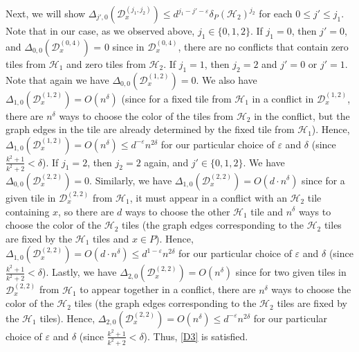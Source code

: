 \documentclass{article}
\theoremstyle{definition}
\newcommand\cH{{\mathcal H}}
\newcommand{\cD}{\mathcal{D}}
\begin{document}
    Next, we will show $\Delta_{j',0} \left(\cD_x^{(j_1,j_2)} \right) \leq d^{j_1 - j' - \varepsilon} \delta_P(\cH_2)^{j_2}$ for each $0 \leq j' \leq j_1$.  Note that in our case, as we observed above, $j_1 \in \{ 0, 1, 2 \}$.  If $j_1 = 0$, then $j' = 0$, and $\Delta_{0,0}\left(\cD_x^{(0,4)} \right)$ = 0 since in $\cD_x^{(0,4)}$, there are no conflicts that contain zero tiles from $\cH_1$ and zero tiles from $\cH_2$.  If $j_1 = 1$, then $j_2 = 2$ and $j' = 0$ or $j' = 1$.  Note that again we have $\Delta_{0,0} \left(\cD_x^{(1,2)} \right) = 0$.  We also have $\Delta_{1,0} \left(\cD_x^{(1,2)} \right) = O(n^\delta)$ (since for a fixed tile from $\cH_1$ in a conflict in $\cD_x^{(1,2)}$, there are $n^\delta$ ways to choose the color of the tiles from $\cH_2$ in the conflict, but the graph edges in the tile are already determined by the fixed tile from $\cH_1$).  Hence, $\Delta_{1,0}\left(\cD_x^{(1,2)}\right) = O(n^\delta) \leq d^{-\varepsilon} n^{2\delta}$ for our particular choice of $\varepsilon$ and $\delta$ (since $\frac{k^2+1}{k^2+2} < \delta$).  If $j_1 = 2$, then $j_2 = 2$ again, and $j' \in \{0,1,2\}$.  We have $\Delta_{0,0}\left(\cD_x^{(2,2)}\right) = 0$.  Similarly, we have $\Delta_{1,0} \left(\cD_x^{(2,2)} \right) = O(d \cdot n^\delta)$ since for a given tile in $\cD_x^{(2,2)}$ from $\cH_1$, it must appear in a conflict with an $\cH_2$ tile containing $x$, so there are $d$ ways to choose the other $\cH_1$ tile and $n^\delta$ ways to choose the color of the $\cH_2$ tiles (the graph edges corresponding to the $\cH_2$ tiles are fixed by the $\cH_1$ tiles and $x \in P$).  Hence, $\Delta_{1,0}\left(\cD_x^{(2,2)}\right) = O(d \cdot n^\delta) \leq d^{1 -\varepsilon} n^{2\delta}$ for our particular choice of $\varepsilon$ and $\delta$ (since $\frac{k^2+1}{k^2+2} < \delta$).  Lastly, we have $\Delta_{2,0}\left(\cD_x^{(2,2)}\right) = O(n^\delta)$ since for two given tiles in $\cD_x^{(2,2)}$ from $\cH_1$ to appear together in a conflict, there are $n^\delta$ ways to choose the color of the $\cH_2$ tiles (the graph edges corresponding to the $\cH_2$ tiles are fixed by the $\cH_1$ tiles).  Hence, $\Delta_{2,0}\left(\cD_x^{(2,2)}\right) = O( n^\delta) \leq d^{-\varepsilon} n^{2\delta}$ for our particular choice of $\varepsilon$ and $\delta$ (since $\frac{k^2+1}{k^2+2} < \delta$).  Thus, \ref{D3} is satisfied.  
\end{document}
